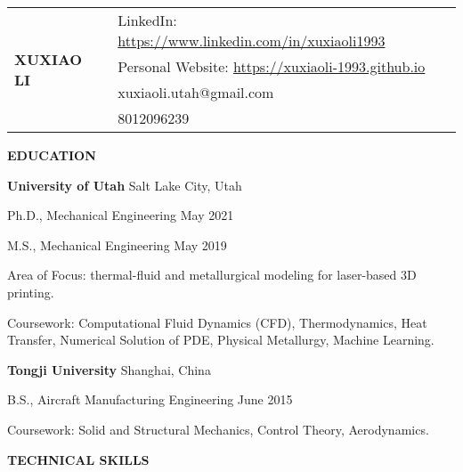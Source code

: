 \documentclass[11pt, letterpaper]{article}
\begin{document}
\begin{tabular}{@{} p{} p{} @{}}
   \multirow{4}{*}{{\textbf{\huge XUXIAO LI}}} & 
    LinkedIn: \href{https://www.linkedin.com/in/xuxiaoli1993}{https://www.linkedin.com/in/xuxiaoli1993} \\
     & Personal Website: \href{https://xuxiaoli-1993.github.io}{https://xuxiaoli-1993.github.io} \\
     & xuxiaoli.utah@gmail.com \\
     & 8012096239
\end{tabular}

\vspace{24pt}



\textbf{EDUCATION}

\fullrule

\textbf{University of Utah} \hfill Salt Lake City, Utah

Ph.D., Mechanical Engineering  \hfill May 2021

M.S., Mechanical Engineering  \hfill May 2019

Area of Focus: thermal-fluid and metallurgical modeling for laser-based 3D printing.

Coursework: Computational Fluid Dynamics (CFD), Thermodynamics, Heat Transfer, Numerical Solution of
PDE, Physical Metallurgy, Machine Learning.

\vskip 6pt

\textbf{Tongji University} 
\hfill
Shanghai, China

B.S., Aircraft Manufacturing Engineering \hfill June 2015

Coursework: Solid and Structural Mechanics, Control Theory, Aerodynamics.

\vskip 9pt

\textbf{TECHNICAL SKILLS}
\end{document}
